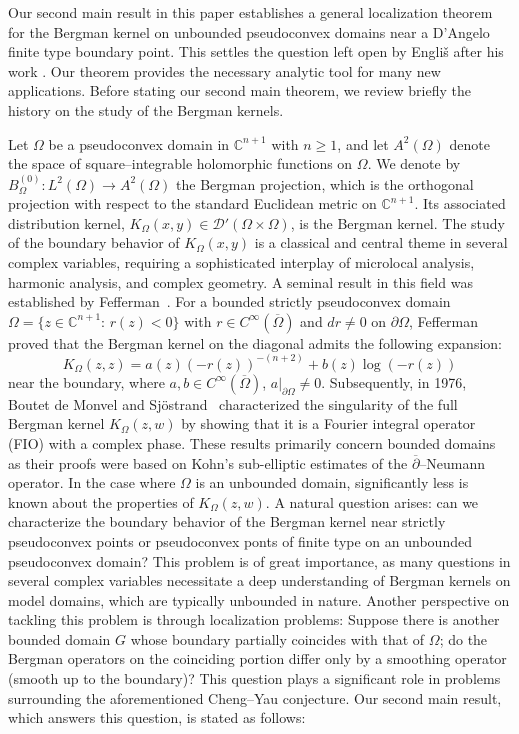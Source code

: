 \documentclass[a4paper,centertags,oneside,12pt]{amsart}
\numberwithin{equation}{section}
\begin{document}
Our second main result  in this paper  establishes a general localization theorem for the Bergman kernel on unbounded pseudoconvex domains near a D’Angelo finite type boundary point. This  settles the question left open by  Engliš after  his work  \cite{Eng01, Eng04}.
Our theorem provides the necessary analytic tool  for many new applications. Before stating our second main theorem, we review briefly  the history on the study of  the Bergman kernels.
  

Let $\Omega$ be a pseudoconvex domain in $\mathbb{C}^{n+1}$ with $n\ge 1$, and let $A^2(\Omega)$ denote the space of square--integrable holomorphic functions on $\Omega$. We denote by 
$B_{\Omega}^{(0)}: L^2(\Omega) \to A^2(\Omega)$ the Bergman projection, which is the orthogonal projection with respect to the standard Euclidean metric on $\mathbb{C}^{n+1}$. Its associated distribution kernel, $K_\Omega(x,y) \in \mathcal{D}'(\Omega \times \Omega)$, is the Bergman kernel. The study of the boundary behavior of $K_\Omega(x,y)$ is a classical and central theme in several complex variables, requiring a sophisticated interplay of microlocal analysis, harmonic analysis, and complex geometry. A seminal result in this field was established by Fefferman~\cite{Fe74}. For a bounded strictly pseudoconvex domain $\Omega = \{z \in \mathbb{C}^{n+1}:\, r(z) < 0\}$ with $r\in C^\infty(\overline\Omega)$ and  $dr \neq 0$ on $\partial \Omega$, Fefferman proved that the Bergman kernel on the diagonal admits the following expansion:
\begin{equation*}\label{feff}
K_\Omega(z,z) = a(z)(-r(z))^{-(n+2)} + b(z)\log(-r(z))
\end{equation*}
near the boundary, where $a, b \in C^\infty(\overline{\Omega})$, $a|_{\partial \Omega}\not =0$. Subsequently, in 1976, Boutet de Monvel and Sj\"ostrand~\cite{BS76} characterized the singularity of the full Bergman kernel $K_\Omega(z, w)$ by showing that it is a Fourier integral operator (FIO) with a complex phase. 
These results primarily concern bounded domains as their proofs were based on Kohn's sub-elliptic estimates of the $\overline\partial$--Neumann operator. 
In the case where $\Omega$ is an unbounded domain, significantly less is known about the properties of $K_\Omega(z, w)$. A natural question arises: can we characterize the boundary behavior of the Bergman kernel near strictly pseudoconvex points or pseudoconvex ponts of finite type on an unbounded pseudoconvex domain? This problem is of great  importance, as many questions in several complex variables necessitate a deep understanding of Bergman kernels on model domains, which are typically unbounded in nature. Another perspective on tackling this problem is through localization problems: Suppose there is another bounded domain $G$ whose boundary partially coincides with that of $\Omega$; do the Bergman operators  on the coinciding portion differ only by a smoothing operator (smooth up to the boundary)? This question  plays a significant role in  problems surrounding the aforementioned Cheng--Yau conjecture. Our second main result, which  answers this question, is stated as follows: 
\end{document}

